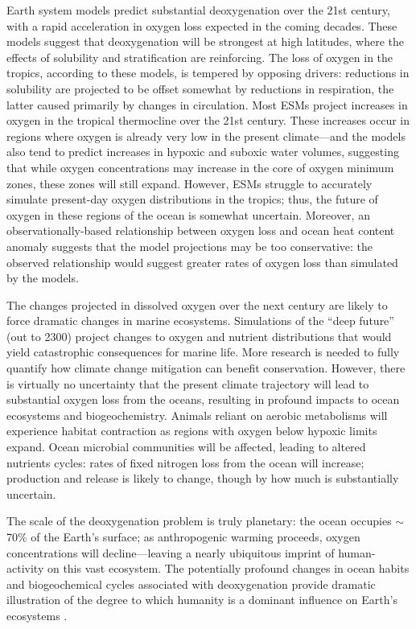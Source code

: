 \documentclass[draft,linenumbers]{report_chapter}
\begin{document}
Earth system models predict substantial deoxygenation over the 21st century, with a rapid acceleration in oxygen loss expected in the coming decades.
These models suggest that deoxygenation will be strongest at high latitudes, where the effects of solubility and stratification are reinforcing.
The loss of oxygen in the tropics, according to these models, is tempered by opposing drivers: reductions in solubility are projected to be offset somewhat by reductions in respiration, the latter caused primarily by changes in circulation.
Most ESMs project increases in oxygen in the tropical thermocline over the 21st century.
These increases occur in regions where oxygen is already very low in the present climate---and the models also tend to predict increases in hypoxic and suboxic water volumes, suggesting that while oxygen concentrations may increase in the core of oxygen minimum zones, these zones will still expand.
However, ESMs struggle to accurately simulate present-day oxygen distributions in the tropics; thus, the future of oxygen in these regions of the ocean is somewhat uncertain.
Moreover, an observationally-based relationship between oxygen loss and ocean heat content anomaly suggests that the model projections may be too conservative: the observed relationship would suggest greater rates of oxygen loss than simulated by the models.

The changes projected in dissolved oxygen over the next century are likely to force dramatic changes in marine ecosystems.
Simulations of the ``deep future'' (out to 2300) project changes to oxygen and nutrient distributions that would yield catastrophic consequences for marine life.
More research is needed to fully quantify how climate change mitigation can benefit conservation.
However, there is virtually no uncertainty that the present climate trajectory will lead to substantial oxygen loss from the oceans, resulting in profound impacts to ocean ecosystems and biogeochemistry.
Animals reliant on aerobic metabolisms will experience habitat contraction as regions with oxygen below hypoxic limits expand.
Ocean microbial communities will be affected, leading to altered nutrients cycles: rates of fixed nitrogen loss from the ocean will increase;  production and release is likely to change, though by how much is substantially uncertain.

The scale of the deoxygenation problem is truly planetary: the ocean occupies $\sim$70\% of the Earth's surface; as anthropogenic warming proceeds, oxygen concentrations will decline---leaving a nearly ubiquitous imprint of human-activity on this vast ecosystem.
The potentially profound changes in ocean habits and biogeochemical cycles associated with deoxygenation provide dramatic illustration of the degree to which humanity is a dominant influence on Earth's ecosystems \citep{Vitousek-Mooney-etal-1997}.


\end{document}
